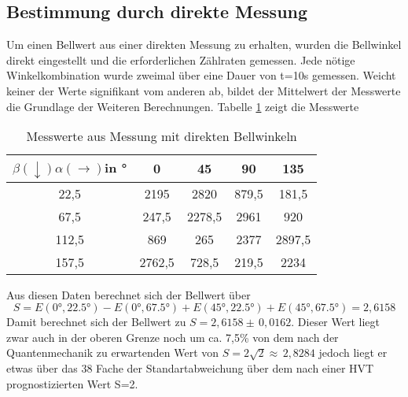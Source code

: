 \documentclass[twoside,colorback,accentcolor=tud4c,11pt]{tudreport}
\begin{document}
\subsection{Bestimmung durch direkte Messung}
Um einen Bellwert aus einer direkten Messung zu erhalten, wurden die Bellwinkel direkt eingestellt und die erforderlichen Zählraten gemessen. Jede nötige Winkelkombination wurde zweimal über eine Dauer von t=10s gemessen. Weicht keiner der Werte signifikant vom anderen ab, bildet der Mittelwert der Messwerte die Grundlage der Weiteren Berechnungen. Tabelle \ref{bellwerte} zeigt die Messwerte
\begin{table}[H]
\renewcommand*{\arraystretch}{1.2}
\centering
\begin{tabular}{|c|c|c|c|c|}
\hline 
$\beta(\downarrow)\alpha(\rightarrow)$in ° & 0 & 45 & 90 & 135 \\ 
\hline 
22,5 & 2195 & 2820 & 879,5 & 181,5 \\ 
\hline 
67,5 & 247,5 & 2278,5 & 2961 & 920 \\ 
\hline 
112,5 & 869 & 265 & 2377 & 2897,5 \\ 
\hline 
157,5 & 2762,5 & 728,5 & 219,5 & 2234 \\ 
\hline 
\end{tabular} 
\caption{Messwerte aus Messung mit direkten Bellwinkeln}\label{bellwerte}
\end{table}
Aus diesen Daten berechnet sich der Bellwert über 
\begin{equation}
S=E(0°,22.5°)-E(0°,67.5°)+E(45°,22.5°)+E(45°,67.5°)=2,6158
\end{equation}
Damit berechnet sich der Bellwert zu $S=2,6158\pm\,0,0162$. Dieser Wert liegt zwar auch in der oberen Grenze noch um ca. 7,5\% von dem nach der Quantenmechanik zu erwartenden Wert von $S=2\sqrt{2}\approx\,2,8284$ jedoch liegt er etwas über das 38 Fache der Standartabweichung über dem nach einer HVT prognostizierten Wert S=2.
\end{document}
